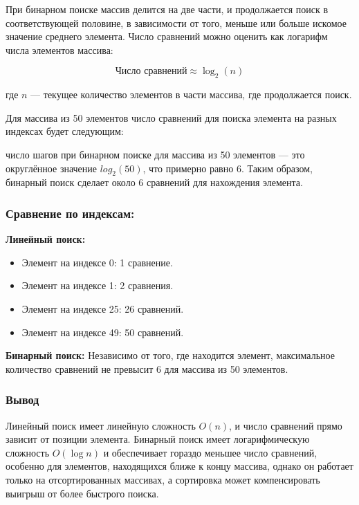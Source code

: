 \hspace{1.25cm}
При бинарном поиске массив делится на две части, и продолжается поиск в соответствующей половине, в зависимости от того, меньше или больше искомое значение среднего элемента. Число сравнений можно оценить как логарифм числа элементов массива:

\[
\text{Число сравнений} \approx \log_2(n)
\]

где \(n\) — текущее количество элементов в части массива, где продолжается поиск.

Для массива из 50 элементов число сравнений для поиска элемента на разных индексах будет следующим:

число шагов при бинарном поиске для массива из 50 элементов — это округлённое значение $log_2(50)$, что примерно равно 6. Таким образом, бинарный поиск сделает около 6 сравнений для нахождения элемента.

\subsubsection*{Сравнение по индексам:}

\textbf{Линейный поиск:}
\begin{itemize}
    \item Элемент на индексе 0: 1 сравнение.
    \item Элемент на индексе 1: 2 сравнения.
    \item Элемент на индексе 25: 26 сравнений.
    \item Элемент на индексе 49: 50 сравнений.
\end{itemize}

\textbf{Бинарный поиск:}
Независимо от того, где находится элемент, максимальное количество сравнений не превысит 6 для массива из 50 элементов.

\subsubsection*{Вывод}

\hspace{1.25cm}
Линейный поиск имеет линейную сложность \(O(n)\), и число сравнений прямо зависит от позиции элемента. Бинарный поиск имеет логарифмическую сложность \(O(\log n)\) и обеспечивает гораздо меньшее число сравнений, особенно для элементов, находящихся ближе к концу массива, однако он работает только на отсортированных массивах, а сортировка может компенсировать выигрыш от более быстрого поиска.

\newpage